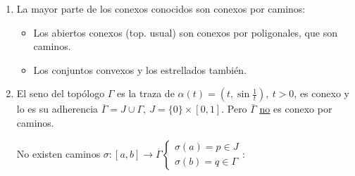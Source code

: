 \begin{ej}
\begin{enumerate}
    \item La mayor parte de los conexos conocidos son conexos por caminos:
    \begin{itemize}
        \item Los abiertos conexos (top. usual) son conexos por poligonales, que son caminos.
        \item Los conjuntos convexos y los estrellados también.
    \end{itemize}
    \item El seno del topólogo $\Gamma$ es la traza de $\alpha\left( t \right) = \left( t, \sin\frac{1}{t} \right),\ t > 0$, es conexo y lo es su adherencia $\overline{\Gamma} = J \cup \Gamma,\ J = \{0\} \times \left[ 0, 1 \right]$. Pero $\overline{\Gamma}$ \underline{no} es conexo por caminos.
    \begin{demo}
        No existen caminos $\sigma: \left[ a, b \right] \rightarrow \overline{\Gamma} \begin{cases}
            \sigma\left( a \right) = p \in J\\
            \sigma\left( b \right) = q \in \Gamma
        \end{cases}$:
        \begin{figure}[H]
            \centering
\end{figure}
\end{demo}
\end{enumerate}
\end{ej}
